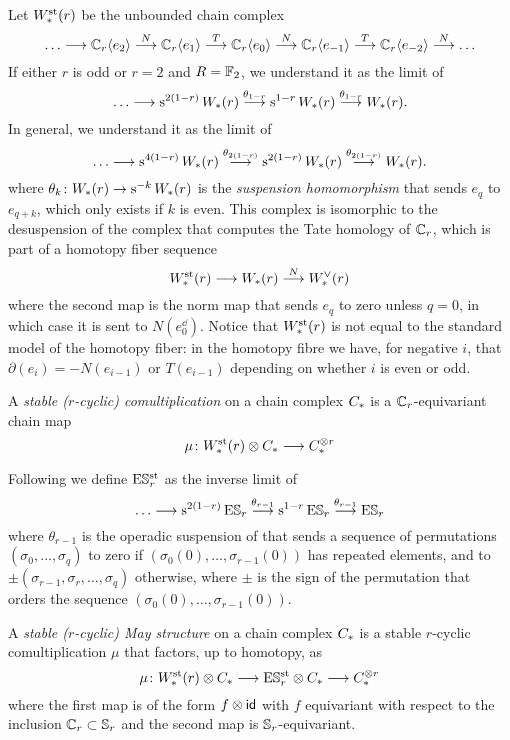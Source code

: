 Let $W^{\mathrm{st}}_{*}(r)$ be the unbounded chain complex
\[
\ldots\longrightarrow \mathbb{C}_r\langle e_2\rangle \overset{N}{\longrightarrow}
\mathbb{C}_r\langle e_1\rangle \overset{T}{\longrightarrow}
\mathbb{C}_r\langle e_0\rangle \overset{N}{\longrightarrow}
\mathbb{C}_r\langle e_{-1}\rangle \overset{T}{\longrightarrow}
\mathbb{C}_r\langle e_{-2}\rangle \overset{N}{\longrightarrow}
\ldots
\]
If either $r$ is odd or $r=2$ and $R=\mathbb{F}_2$, we understand it as the limit of
\[
\ldots\longrightarrow \operatorname{s}^{2(1-r)}W_{*}(r)\overset{\theta_{1-r}}{\longrightarrow} \operatorname{s}^{1-r} W_{*}(r) \overset{\theta_{1-r}}{\longrightarrow} W_{*}(r).
\]
In general, we understand it as the limit of
\[
\ldots\longrightarrow \operatorname{s}^{4(1-r)}W_{*}(r)\overset{\theta_{2(1-r)}}{\longrightarrow} \operatorname{s}^{2(1-r)} W_{*}(r) \overset{\theta_{2(1-r)}}{\longrightarrow} W_{*}(r).
\]
where $\theta_{k} \colon  W_{*}(r)\to \operatorname{s}^{-k} W_{*}(r)$ is the \emph{suspension homomorphism} that sends $e_{q}$ to $e_{q+k}$, which only exists if $k$ is even. %
 This complex is isomorphic to the desuspension of the complex that computes the Tate homology of $\mathbb{C}_r$, which is part of a homotopy fiber sequence
\[
	W^{\mathrm{st}}_{*}(r)\longrightarrow W_{*}(r)\overset{N}{\longrightarrow} W^\vee_{*}(r)
\]
where the second map is the norm map that sends $e_q$ to zero unless $q=0$, in which case it is sent to $N(e_0^\dd)$. Notice that $W^{\mathrm{st}}_{*}(r)$ is not equal to the standard model of the homotopy fiber: in the homotopy fibre we have, for negative $i$, that $\partial(e_i) = -N(e_{i-1})$ or $T(e_{i-1})$ depending on whether $i$ is even or odd.



\begin{definition} A \emph{stable ($r$-cyclic) comultiplication} on a chain complex $C_{*}$ is a $\mathbb{C}_r$-equivariant chain map
\[
\mu \colon  W^{\mathrm{st}}_{*}(r) \otimes  C_{*}\longrightarrow C_{*}^{ \otimes  r}
\]
\end{definition}

Following \cite{Gill2020} we define $\mathrm{E}\mathbb{S}^{\mathrm{st}}_r$ as the inverse limit of
\[
	\ldots \longrightarrow \operatorname{s}^{2(1-r)} \mathrm{E}\mathbb{S}_r\overset{\theta_{r-1}}{\longrightarrow }\operatorname{s}^{1-r} \mathrm{E}\mathbb{S}_r\overset{\theta_{r-1}}{\longrightarrow} \mathrm{E}\mathbb{S}_r
\]
where $\theta_{r-1}$ is the operadic suspension of \cite{berger2004combinatorial} that sends a sequence of permutations $(\sigma_0,\ldots,\sigma_q)$ to zero if $(\sigma_0(0),\ldots,\sigma_{r-1}(0))$ has repeated elements, and to $\pm (\sigma_{r-1},\sigma_r,\ldots,\sigma_q)$ otherwise, where $\pm$ is the sign of the permutation that orders the sequence $(\sigma_0(0),\ldots,\sigma_{r-1}(0))$.

\begin{definition} A \emph{stable ($r$-cyclic) May structure} on a chain complex $C_{*}$ is a stable $r$-cyclic comultiplication $\mu$ that factors, up to homotopy, as
\[
\mu \colon  W^{\mathrm{st}}_{*}(r) \otimes  C_{*}\longrightarrow \mathrm{E}\mathbb{S}^{\mathrm{st}}_r \otimes  C_{*}\longrightarrow  C_{*}^{ \otimes  r}
\]
where the first map is of the form $f \otimes  \mathsf{id}$ with $f$ equivariant with respect to the inclusion $\mathbb{C}_r\subset \mathbb{S}_r$ and the second map is $\mathbb{S}_r$-equivariant.
\end{definition}

